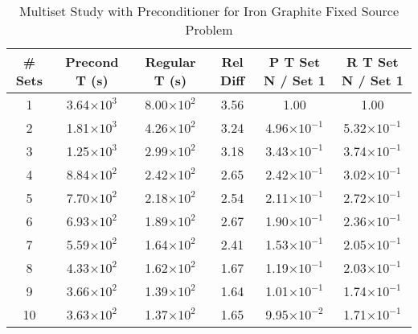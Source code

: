 \begin{table}[!h]
\caption{Multiset Study with Preconditioner for Iron Graphite Fixed Source Problem}
\begin{center}
\begin{tabular}{c c c c c c}
\hline
\# Sets & Precond T (s) & Regular T (s) & Rel Diff & P T Set N / Set 1 & R T Set N / Set 1 \\[0.5ex]
\hline
1   & 3.64$\times 10^{3}$  & 8.00$\times 10^{2}$ & 3.56 & 1.00                              & 1.00 \\
2   & 1.81$\times 10^{3}$	& 4.26$\times 10^{2}$ & 3.24 & 4.96$\times 10^{-1}$ & 5.32$\times 10^{-1}$ \\
3   & 1.25$\times 10^{3}$	& 2.99$\times 10^{2}$ & 3.18 & 3.43$\times 10^{-1}$ & 3.74$\times 10^{-1}$ \\
4   & 8.84$\times 10^{2}$	& 2.42$\times 10^{2}$ & 2.65 & 2.42$\times 10^{-1}$ & 3.02$\times 10^{-1}$ \\ 
5   & 7.70$\times 10^{2}$	& 2.18$\times 10^{2}$ & 2.54 & 2.11$\times 10^{-1}$ & 2.72$\times 10^{-1}$ \\
6   & 6.93$\times 10^{2}$	& 1.89$\times 10^{2}$ & 2.67 & 1.90$\times 10^{-1}$ & 2.36$\times 10^{-1}$ \\
7   & 5.59$\times 10^{2}$	& 1.64$\times 10^{2}$ & 2.41 & 1.53$\times 10^{-1}$ & 2.05$\times 10^{-1}$ \\
8   & 4.33$\times 10^{2}$	& 1.62$\times 10^{2}$ & 1.67 & 1.19$\times 10^{-1}$ & 2.03$\times 10^{-1}$ \\
9   & 3.66$\times 10^{2}$	& 1.39$\times 10^{2}$ & 1.64 & 1.01$\times 10^{-1}$ & 1.74$\times 10^{-1}$ \\
10 & 3.63$\times 10^{2}$	& 1.37$\times 10^{2}$ & 1.65 & 9.95$\times 10^{-2}$ & 1.71$\times 10^{-1}$ \\
\hline 
\end{tabular} 
\end{center}
\label{table:FeC multisets}
\end{table}


